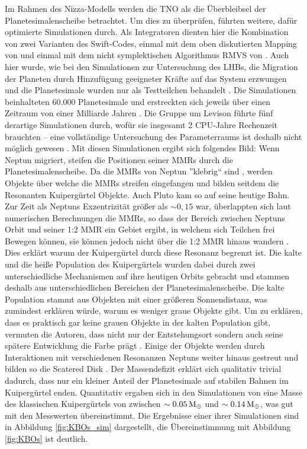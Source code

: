 \documentclass[12pt,a4paper,twoside,open=right,bibliography=totoc]{scrbook}
\renewcommand{\cite}{ \citep}
\newcommand{\ME}{M_\oplus}
\begin{document}
\noindent
Im Rahmen des Nizza-Modells werden die TNO als die Überbleibsel der Planetesimalenscheibe betrachtet.
Um dies zu überprüfen, führten \cite{Levison2008} weitere, dafür optimierte Simulationen durch. Als Integratoren  dienten hier die Kombination von zwei Varianten des Swift-Codes, einmal mit dem oben diskutierten Mapping von \cite{Wisdom1991} und einmal mit dem nicht symplektischen Algorithmus RMVS von \cite{Levison1994}. Auch hier wurde, wie bei den Simulationen zur Untersuchung des LHBs, die Migration der Planeten durch Hinzufügung geeigneter Kräfte auf das System erzwungen und die Planetesimale wurden nur als Testteilchen behandelt\cite{Levison2008}.
Die Simulationen beinhalteten 60.000 Planetesimale und erstreckten sich jeweils über einen Zeitraum von einer Milliarde Jahren\cite{Levison2008}. Die Gruppe um Levison führte fünf derartige Simulationen durch, wofür sie insgesamt 2 CPU-Jahre Rechenzeit brauchten – eine vollständige Untersuchung des Parameterraums ist deshalb nicht möglich gewesen\cite{Levison2008}.
Mit diesen Simulationen ergibt sich folgendes Bild:
Wenn Neptun migriert, steifen die Positionen seiner MMRs durch die Planetesimalenscheibe. Da die MMRs von Neptun ''klebrig`` sind\cite{Levison2008}, werden Objekte über welche die MMRs streifen eingefangen und bilden seitdem die Resonanten Kuipergürtel Objekte. Auch Pluto kam so auf seine heutige Bahn.
Zur Zeit als Neptuns Exzentrizität größer als $\sim 0,15$ war, überlappten sich laut numerischen Berechnungen die MMRs, so dass der Bereich zwischen Neptuns Orbit und seiner 1:2 MMR ein Gebiet ergibt, in welchem sich Teilchen frei Bewegen können, sie können jedoch nicht über die 1:2 MMR hinaus wandern\cite{Levison2008}. Dies erklärt warum der Kuipergürtel durch diese Resonanz begrenzt ist.
Die kalte und die heiße Population des Kuipergürtels wurden dabei durch zwei unterschiedliche Mechanismen auf ihre heutigen Orbits gebracht und stammen deshalb aus unterschiedlichen Bereichen der Planetesimalenscheibe. Die kalte Population stammt aus Objekten mit einer größeren Sonnendistanz, was zumindest erklären würde, warum es weniger graue Objekte gibt. Um zu erklären, dass es praktisch gar keine grauen Objekte in der kalten Population gibt, vermuten die Autoren, dass nicht nur der Entstehungsort sondern auch seine spätere Entwicklung die Farbe prägt\cite{Levison2008}.
Einige der Objekte werden durch Interaktionen mit verschiedenen Resonanzen Neptuns weiter hinaus gestreut und bilden so die Scatered Disk\cite{Levison2008}.
Der Massendefizit erklärt sich qualitativ trivial dadurch, dass nur ein kleiner Anteil der Planetesimale auf stabilen Bahnen im Kuipergürtel enden. Quantitativ ergaben sich in den Simulationen von \cite{Levison2008} eine Masse des klassischen Kuipergürtels von zwischen $\sim\unit[0.05]{\ME}$ und $\sim\unit[0.14]{\ME}$, was gut mit den Messwerten übereinstimmt.
Die Ergebnisse einer ihrer Simulationen sind in Abbildung \ref{fig:KBOs_sim} dargestellt, die Übereinstimmung mit Abbildung \ref{fig:KBOs} ist deutlich.
\end{document}

